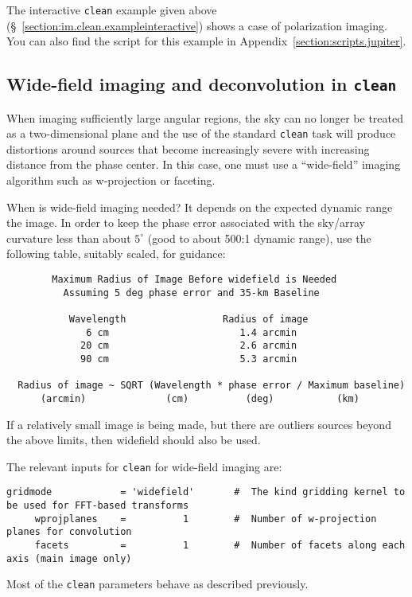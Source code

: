 The interactive {\tt clean} example given above 
(\S~\ref{section:im.clean.exampleinteractive}) shows
a case of polarization imaging.  You can also find the script for
this example in Appendix~\ref{section:scripts.jupiter}.

\subsection{Wide-field imaging and deconvolution in {\tt clean}}
\label{section:im.clean.widefield}

When imaging sufficiently large angular regions, the sky can no longer
be treated as a two-dimensional plane and the use of the standard {\tt clean}
task will produce distortions around sources that become
increasingly severe with increasing distance from the phase center.
In this case, one must use a ``wide-field'' imaging algorithm such as
w-projection or faceting.

When is wide-field imaging needed?  It depends on the expected dynamic
range the image.  In order to keep the phase error associated with the
sky/array curvature less than about $5^\circ$ (good to about 500:1
dynamic range), use the following table, suitably scaled, for
guidance:
\small
\begin{verbatim}
        Maximum Radius of Image Before widefield is Needed
          Assuming 5 deg phase error and 35-km Baseline

           Wavelength                 Radius of image
              6 cm                       1.4 arcmin
             20 cm                       2.6 arcmin
             90 cm                       5.3 arcmin

  Radius of image ~ SQRT (Wavelength * phase error / Maximum baseline)
      (arcmin)              (cm)          (deg)           (km)
\end{verbatim}
\normalsize
If a relatively small image is being made, but there are outliers
sources beyond the above limits, then widefield should also be used.

The relevant inputs for {\tt clean} for wide-field imaging are:
\small
\begin{verbatim}
gridmode            = 'widefield'       #  The kind gridding kernel to be used for FFT-based transforms
     wprojplanes    =          1        #  Number of w-projection planes for convolution
     facets         =          1        #  Number of facets along each axis (main image only)
\end{verbatim}
\normalsize
Most of the {\tt clean} parameters behave as described previously.

